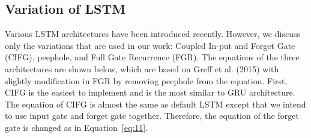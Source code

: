 \subsection{Variation of LSTM}
Various LSTM architectures have been introduced recently.
However, we discuss only the variations that are used in our work: 
Coupled In-put and Forget Gate (CIFG), peephole, and Full Gate Recurrence 
(FGR). The equations of the three architectures are shown below, 
which are based on Greff et al. (2015) \cite{greff2017lstm}
with slightly modification in FGR by removing peephole from the equation.
First, CIFG is the easiest to implement and is the most similar to GRU architecture.
The equation of CIFG is almost the same as default LSTM except that
we intend to use input gate and forget gate together. 
Therefore, the equation of the forget gate is changed as in Equation~\ref{eq:11}.

